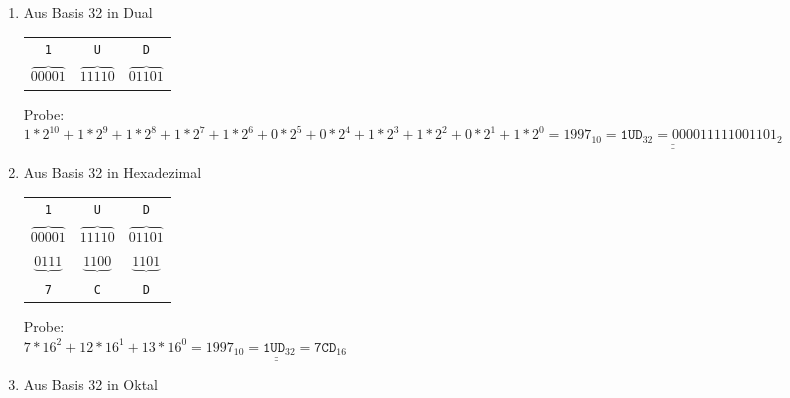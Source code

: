 \documentclass[12pt,a4paper]{scrreprt}
\newcommand{\lsg}[1]{\underline{\underline{#1}}}
\begin{document}
\begin{enumerate}
\begin{enumerate}
\begin{enumerate}
\end{enumerate}
\begin{enumerate}
\item Aus Basis 32 in Dual 

\begin{tabular}{ccc}
 \texttt{1} & \texttt{U} & \texttt{D} \\
 $\overbrace{00001}$ & $\overbrace{11110}$ & $\overbrace{01101}$ %
\end{tabular}
\par Probe: \\
\begin{math}
 1*2^10
+1*2^9
+1*2^8
+1*2^7
+1*2^6
+0*2^5
+0*2^4
+1*2^3
+1*2^2
+0*2^1
+1*2^0
= \lsg{
	{1997}_{10} = \texttt{1UD}_{32} = {000011111001101}_{2}
}
\end{math}

\item Aus Basis 32 in Hexadezimal 

\begin{tabular}{ccc}
 \texttt{1} & \texttt{U} & \texttt{D} \\
 $\overbrace{00001}$ & $\overbrace{11110}$ & $\overbrace{01101}$ \\ %
 $\underbrace{0111}$ & $\underbrace{1100}$ & $\underbrace{1101}$ \\ %
 \texttt{7} & \texttt{C} & \texttt{D} 
\end{tabular}
\par Probe: \\
\begin{math}
  7*16^2
+12*16^1
+13*16^0
= \lsg{
	{1997}_{10} = \texttt{1UD}_{32} = \texttt{7CD}_{16}
}
\end{math}

\item Aus Basis 32 in Oktal 


\end{enumerate}
\end{enumerate}
\end{enumerate}
\end{document}
